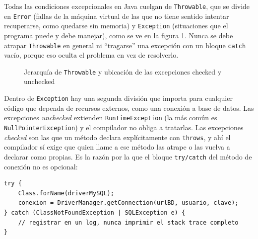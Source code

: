 \documentclass[10pt,a4paper]{article}
\begin{document}
Todas las condiciones excepcionales en Java cuelgan de \texttt{Throwable}, que se divide en \texttt{Error} (fallas de la máquina virtual de las que no tiene sentido intentar recuperarse, como quedarse sin memoria) y \texttt{Exception} (situaciones que el programa puede y debe manejar), como se ve en la figura \ref{img:excepciones}. Nunca se debe atrapar \texttt{Throwable} en general ni \enquote{tragarse} una excepción con un bloque \texttt{catch} vacío, porque eso oculta el problema en vez de resolverlo.

\begin{figure}[H]
	\centering
	\caption{Jerarquía de \texttt{Throwable} y ubicación de las excepciones checked y unchecked}
	\label{img:excepciones}
\end{figure}

Dentro de \texttt{Exception} hay una segunda división que importa para cualquier código que dependa de recursos externos, como una conexión a base de datos. Las excepciones \textit{unchecked} extienden \texttt{RuntimeException} (la más común es \texttt{NullPointerException}) y el compilador no obliga a tratarlas. Las excepciones \textit{checked} son las que un método declara explícitamente con \texttt{throws}, y ahí el compilador sí exige que quien llame a ese método las atrape o las vuelva a declarar como propias. Es la razón por la que el bloque \texttt{try/catch} del método de conexión no es opcional:

\begin{lstlisting}[caption={Manejo obligatorio de dos excepciones checked distintas}]
try {
    Class.forName(driverMySQL);
    conexion = DriverManager.getConnection(urlBD, usuario, clave);
} catch (ClassNotFoundException | SQLException e) {
    // registrar en un log, nunca imprimir el stack trace completo
}
\end{lstlisting}
\end{document}

